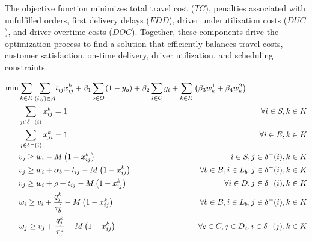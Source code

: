 \documentclass{article}
\begin{document}
The objective function minimizes total travel cost ($TC$), penalties associated with unfulfilled orders, first delivery delays ($FDD$), driver underutilization costs ($DUC$), and driver overtime costs ($DOC$). Together, these components drive the optimization process to find a solution that efficiently balances travel costs, customer satisfaction, on-time delivery, driver utilization, and scheduling constraints.

\begin{alignat}{3}
    \label{mod:obj}   \min & \sum_{k \in K}{{ \sum_{ \substack{(i,j) \in A} }} {t_{ij}x^{k}_{ij}}} + \beta_1\smashoperator{\sum_{ o \in O}}{  \left(1-y_o\right)} \hspace{-0mm}  + \beta_2 \smashoperator{ \sum_{i \in C } } { g_i  } +  \sum_{k \in K}\left({\beta_3 w^{1}_k  + \beta_4  w^{2}_k}\right) &                                                                                                  \\
    \label{mod:c1}         & \sum_{j \in \delta^{+}(i) }{x^k_{ij}} =1     & \forall i \in S, k \in K                                                                      \\
    \label{mod:c2}         & \sum_{j \in \delta^{-}(i)}{x^k_{ji}} = 1     & \forall i \in E, k \in K                                                                         \\
    \label{mod:c03}        & v_j \geq  w_i  - M\left(1-x^{k}_{ij}\right)   & \hspace{-20mm}  i \in S, j \in \delta^{+}(i),  k \in K      \\
    \label{mod:c3}         & v_j \geq  w_i + \alpha_{b} + t_{ij} - M\left(1-x^{k}_{ij}\right) & \hspace{-25mm} \forall b \in B, i \in L_b, j \in \delta^{+}(i),  k \in K     \\
    \label{mod:c4}         & v_j \geq  w_i + \rho + t_{ij} - M\left(1-x^{k}_{ij}\right)                                                                       & \hspace{-20mm} \forall i \in D  , j \in \delta^{+}(i), k \in K                         \\
    \label{mod:c5}         & w_{i} \geq v_{i}  + \frac{q^k_j}{\tau^l_b} -M\left(1- x^{k}_{ij}\right)   & \hspace{-25mm} \forall  b \in B,  i \in L_{b},  j \in \delta^{+}(i), k \in K \\
    \label{mod:c6}         & w_{j} \geq v_{j}  + {  \frac{q^k_j}{\tau^u_c} -M\left(1- x^{k}_{ij}\right) }     & \hspace{-25mm}  \forall c \in  C, j \in D_{c}, i \in \delta^{-}(j),  k \in K \\

\end{alignat}
\end{document}
